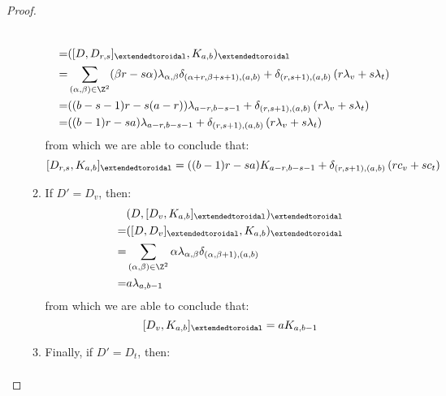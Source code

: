 \begin{proof}
\begin{enumerate}
\begin{enumerate}
$$\begin{aligned}
                                    \\
                                    = & ( [D, D_{r, s}]_{\extendedtoroidal}, K_{a, b} )_{\extendedtoroidal}
                                    \\
                                    = & \sum_{(\alpha, \beta) \in \Z^2} (\beta r - s \alpha) \lambda_{\alpha, \beta} \delta_{(\alpha + r, \beta + s + 1), (a, b)} + \delta_{(r, s + 1), (a, b)} \left( r\lambda_v + s\lambda_t \right)
                                    \\
                                    = & ((b - s - 1) r - s (a - r)) \lambda_{a - r, b - s - 1} + \delta_{(r, s + 1), (a, b)} \left( r\lambda_v + s\lambda_t \right)
                                    \\
                                    = & ((b - 1)r - sa) \lambda_{a - r, b - s - 1} + \delta_{(r, s + 1), (a, b)} \left( r\lambda_v + s\lambda_t \right)
                                \end{aligned}
                            $$
                        from which we are able to conclude that:
                            $$[D_{r, s}, K_{a, b}]_{\extendedtoroidal} = ((b - 1)r - sa) K_{a - r, b - s - 1} + \delta_{(r, s + 1), (a, b)} \left( r c_v + s c_t \right)$$
                        \item If $D' = D_v$, then:
                            $$
                                \begin{aligned}
                                    & ( D, [D_v, K_{a, b}]_{\extendedtoroidal} )_{\extendedtoroidal}
                                    \\
                                    = & ( [D, D_v]_{\extendedtoroidal}, K_{a, b} )_{\extendedtoroidal}
                                    \\
                                    = & \sum_{(\alpha, \beta) \in \Z^2} \alpha \lambda_{\alpha, \beta} \delta_{(\alpha, \beta + 1), (a, b)} 
                                    \\
                                    = & a \lambda_{a, b - 1}
                                \end{aligned}
                            $$
                        from which we are able to conclude that:
                            $$[D_v, K_{a, b}]_{\extendedtoroidal} = aK_{a, b - 1}$$   
                        \item Finally, if $D' = D_t$, then:
                            $$
                                \begin{aligned}

\end{aligned}$$
\end{enumerate}
\end{enumerate}
\end{proof}
